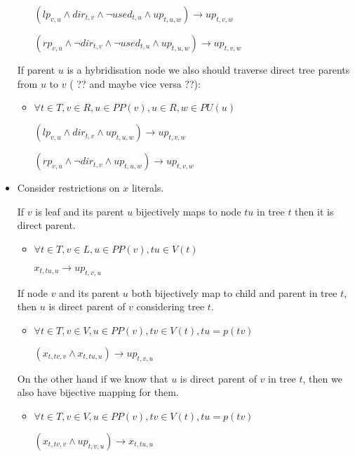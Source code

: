 \documentclass[runningheads, envcountsame, a4paper]{llncs}
\begin{document}
\begin{itemize}
\begin{itemize}
    $(lp_{v,u} \wedge dir_{t,v} \wedge \neg used_{t,u} \wedge up_{t,u,w}) \rightarrow up_{t,v,w}$

    $(rp_{v,u} \wedge \neg dir_{t,v} \wedge \neg used_{t,u} \wedge up_{t,u,w}) \rightarrow up_{t,v,w}$
	\end {itemize}
	
	If parent $u$ is a hybridisation node we also should traverse direct tree parents from $u$ to $v$ ( ?? and maybe vice versa ??):
	
    \begin{itemize}
    \item $\forall t \in T, v \in R, u \in PP(v), u \in R, w \in PU(u)$
	
    $(lp_{v,u} \wedge dir_{t,v} \wedge up_{t,u,w}) \rightarrow up_{t,v,w}$

    $(rp_{v,u} \wedge \neg dir_{t,v} \wedge up_{t,u,w}) \rightarrow up_{t,v,w}$
	\end {itemize}

\item Consider restrictions on $x$ literals.

	If $v$ is leaf and its parent $u$ bijectively maps to node $tu$ in tree $t$ then it is direct parent.	    

	\begin{itemize}
    \item $\forall t \in T, v \in L, u \in PP(v), tu \in V(t)$

	$x_{t,tu,u} \rightarrow up_{t,v,u}$
	\end {itemize}
	
	If node $v$ and its parent $u$ both bijectively map to child and parent in tree $t$, then $u$ is direct parent of $v$ considering tree $t$.

	\begin{itemize}
    \item $\forall t \in T, v \in V, u \in PP(v), tv \in V(t), tu = p(tv)$

	$(x_{t,tv,v} \wedge x_{t,tu,u}) \rightarrow up_{t,v,u}$
	\end {itemize}
	
	On the other hand if we know that $u$ is direct parent of $v$ in tree $t$, then we also have bijective mapping for them.

	\begin{itemize}
    \item $\forall t \in T, v \in V, u \in PP(v), tv \in V(t), tu = p(tv)$

	$(x_{t,tv,v} \wedge up_{t,v,u}) \rightarrow x_{t,tu,u}$
	\end {itemize}
	

\end{itemize}
\end{document}
